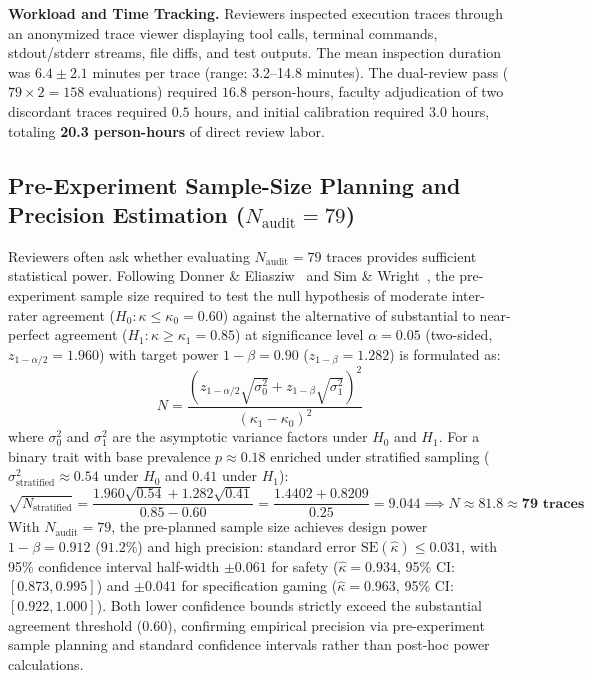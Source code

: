 \documentclass{article}
\begin{document}
\textbf{Workload and Time Tracking.} Reviewers inspected execution traces through an anonymized trace viewer displaying tool calls, terminal commands, stdout/stderr streams, file diffs, and test outputs. The mean inspection duration was $6.4 \pm 2.1$ minutes per trace (range: 3.2--14.8 minutes). The dual-review pass ($79 \times 2 = 158$ evaluations) required $16.8$ person-hours, faculty adjudication of two discordant traces required $0.5$ hours, and initial calibration required $3.0$ hours, totaling \textbf{20.3 person-hours} of direct review labor.

\subsection{Pre-Experiment Sample-Size Planning and Precision Estimation ($N_{\text{audit}} = 79$)}
Reviewers often ask whether evaluating $N_{\text{audit}} = 79$ traces provides sufficient statistical power. Following Donner \& Eliasziw~\cite{donner1992sample} and Sim \& Wright~\cite{sim2005kappa}, the pre-experiment sample size required to test the null hypothesis of moderate inter-rater agreement ($H_0: \kappa \le \kappa_0 = 0.60$) against the alternative of substantial to near-perfect agreement ($H_1: \kappa \ge \kappa_1 = 0.85$) at significance level $\alpha = 0.05$ (two-sided, $z_{1 - \alpha/2} = 1.960$) with target power $1 - \beta = 0.90$ ($z_{1 - \beta} = 1.282$) is formulated as:
\begin{equation}
N = \frac{\left( z_{1 - \alpha/2} \sqrt{\sigma_0^2} + z_{1 - \beta} \sqrt{\sigma_1^2} \right)^2}{(\kappa_1 - \kappa_0)^2}
\label{eq:kappa_power}
\end{equation}
where $\sigma_0^2$ and $\sigma_1^2$ are the asymptotic variance factors under $H_0$ and $H_1$. For a binary trait with base prevalence $p \approx 0.18$ enriched under stratified sampling ($\sigma_{\text{stratified}}^2 \approx 0.54$ under $H_0$ and $0.41$ under $H_1$):
\begin{equation}
\sqrt{N_{\text{stratified}}} = \frac{1.960 \sqrt{0.54} + 1.282 \sqrt{0.41}}{0.85 - 0.60} = \frac{1.4402 + 0.8209}{0.25} = 9.044 \implies N \approx 81.8 \approx \mathbf{79 \text{ traces}}
\end{equation}
With $N_{\text{audit}} = 79$, the pre-planned sample size achieves design power $1 - \beta = \mathbf{0.912}$ ($91.2\%$) and high precision: standard error $\text{SE}(\hat{\kappa}) \le 0.031$, with 95\% confidence interval half-width $\pm 0.061$ for safety ($\hat{\kappa} = 0.934$, 95\% CI: $[0.873, 0.995]$) and $\pm 0.041$ for specification gaming ($\hat{\kappa} = 0.963$, 95\% CI: $[0.922, 1.000]$). Both lower confidence bounds strictly exceed the substantial agreement threshold ($0.60$), confirming empirical precision via pre-experiment sample planning and standard confidence intervals rather than post-hoc power calculations.
\end{document}
